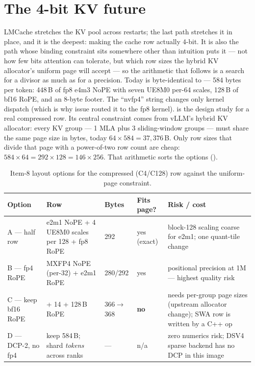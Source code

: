 \section{The 4-bit KV future}

LMCache stretches the KV pool across restarts; the last path stretches it
in place, and it is the deepest: making the cache row actually 4-bit. It is
also the path whose binding constraint sits somewhere other than intuition
puts it --- not how few bits attention can tolerate, but which row sizes the
hybrid KV allocator's uniform page will accept --- so the arithmetic that
follows is a search for a divisor as much as for a precision. Today
 is byte-identical to  --- 584 bytes per
token: 448\,B of fp8 e4m3 NoPE with seven UE8M0 per-64 scales, 128\,B of
bf16 RoPE, and an 8-byte footer. The ``nvfp4'' string changes only kernel
dispatch (which is why issue  routed it to the fp8 kernel).
 is the design study for a real
compressed row. Its central constraint comes from vLLM's hybrid KV
allocator: every KV group --- 1 MLA plus 3 sliding-window groups --- must
share the same page size in bytes, today $64 \times 584 = 37{,}376$\,B. Only
row sizes that divide that page with a power-of-two row count are cheap:
$584 \times 64 = 292 \times 128 = 146 \times 256$. That arithmetic sorts the
options ().

\begin{table}[htbp]
\centering\footnotesize
\caption{Item-8 layout options for the compressed (C4/C128) row against the
uniform-page constraint.}
\label{tab:fp4-options}
\begin{tabular}{>{\raggedright\arraybackslash}p{2.6cm}>{\raggedright\arraybackslash}p{3.6cm}p{1.4cm}p{1.3cm}>{\raggedright\arraybackslash}p{3.4cm}}
\toprule
Option & Row & Bytes & Fits page? & Risk / cost \\
\midrule
A --- half row & e2m1 NoPE + 4 UE8M0 scales per 128 + fp8 RoPE &
292 & yes (exact) & block-128 scaling coarse for e2m1; one quant-tile change \\
B --- fp4 RoPE & MXFP4 NoPE (per-32) + e2m1 RoPE & 280/292 & yes &
positional precision at 1M --- highest quality risk \\
C --- keep bf16 RoPE & 224 + 14 + 128\,B RoPE & 366$\to$368 & \textbf{no} &
needs per-group page sizes (upstream allocator change); SWA row is written by
a C++ op \\
D --- DCP-2, no fp4 & keep 584\,B; shard \emph{tokens} across ranks & --- &
n/a & zero numerics risk; DSV4 sparse backend has no DCP in this image \\
\bottomrule
\end{tabular}
\end{table}

